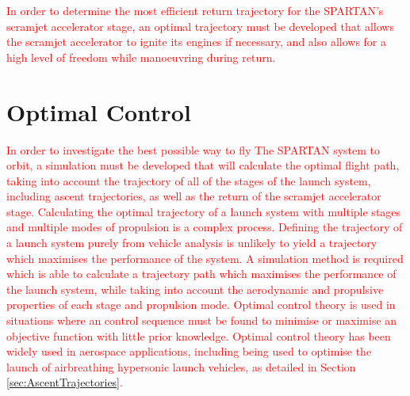 \textcolor{red}{
In order to determine the most efficient return trajectory for the SPARTAN's scramjet accelerator stage, an optimal trajectory must be developed that allows the scramjet accelerator to ignite its engines if necessary, and also allows for a high level of freedom while manoeuvring during return. 
}


\section{Optimal Control}\label{sec:Optimisation}





\textcolor{red}{In order to investigate the best possible way to fly The SPARTAN system to orbit, a simulation must be developed that will calculate the optimal flight path, taking into account the trajectory of all of the stages of the launch system, including ascent trajectories, as well as the return of the scramjet accelerator stage. 
Calculating the optimal trajectory of a launch system with multiple stages and multiple modes of propulsion is a complex process. 
Defining the trajectory of a launch system purely from vehicle analysis is unlikely to yield a trajectory which maximises the performance of the system.
A simulation method is required which is able to calculate a trajectory path which maximises the performance of the launch system, while taking into account the aerodynamic and propulsive properties of each stage and propulsion mode. 
Optimal control theory is used in situations where an control sequence must be found to minimise or maximise an objective function with little prior knowledge. 
Optimal control theory has been widely used in aerospace applications, including being used to optimise the launch of airbreathing hypersonic launch vehicles\cite{Powell1991,Lu1993,Trefny1999,Roche2000,Pescetelli2012,Young2006}, \textcolor{red}{as detailed in Section \ref{sec:AscentTrajectories}}.
}


